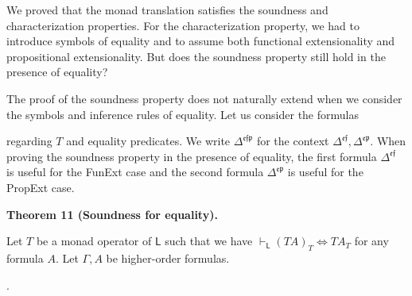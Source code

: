 \documentclass[10pt,a4paper]{article}
\begin{document}
We proved that the monad translation satisfies the soundness and characterization properties. For the characterization property, we had to introduce symbols of equality and to assume both functional extensionality and propositional extensionality. But does the soundness property still hold in the presence of equality?\par
 
 
 
The proof of the soundness property does not naturally extend when we consider the symbols and inference rules of equality. Let us consider the formulas\par
 
\begin{center}\end{center}
 
regarding $T$ and equality predicates. We write $\Delta^{\mathfrak{e}\mathfrak{f}\mathfrak{p}}$ for the context $\Delta^{\mathfrak{e}\mathfrak{f}},\Delta^{\mathfrak{e}\mathfrak{p}}$. When proving the soundness property in the presence of equality, the first formula $\Delta^{\mathfrak{e}\mathfrak{f}}$ is useful for the FunExt case and the second formula $\Delta^{\mathfrak{e}\mathfrak{p}}$ is useful for the PropExt case.\par
 
 
 
\par\medskip\noindent\textbf{Theorem 11 (Soundness for equality).}\par
 
 
Let $T$ be a monad operator of $\mathsf{L}$ such that we have $\vdash_{\mathsf{L}}(TA)_{T}\Leftrightarrow TA_{T}$ for any formula $A$. Let $\Gamma,A$ be higher-order formulas.\par
  
\par{}. 
 
\end{document}
